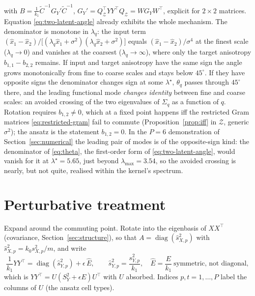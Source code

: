 \documentclass[11pt,a4paper]{article}
\newcommand{\diag}{\operatorname{diag}}
\newcommand{\Ct}{\tilde C}
\newcommand{\Z}{\mathcal Z}
\begin{document}
with $B = \frac1{k_1}\Ct^{-1}G_Y'\Ct^{-1}$, $G_Y' = Q_\Z^\top YY^\top Q_\Z = W G_Y W^\top$, explicit for $2\times2$ matrices. Equation \eqref{eq:two-latent-angle} already exhibits the whole mechanism. The denominator is monotone in $\lambda_q$: the input term $(\hat x_1 - \hat x_2)/\big[(\lambda_q\hat x_1+\sigma^2)(\lambda_q\hat x_2+\sigma^2)\big]$ equals $(\hat x_1-\hat x_2)/\sigma^4$ at the finest scale ($\lambda_q\to0$) and vanishes at the coarsest ($\lambda_q\to\infty$), where only the target anisotropy $b_{1,1}-b_{2,2}$ remains. If input and target anisotropy have the same sign the angle grows monotonically from fine to coarse scales and stays below $45^\circ$. If they have opposite signs the denominator changes sign at some $\lambda^\star$, $\theta_q$ passes through $45^\circ$ there, and the leading functional mode \emph{changes identity} between fine and coarse scales: an avoided crossing of the two eigenvalues of $\Sigma_q$ as a function of $q$. Rotation requires $b_{1,2} \ne 0$, which at a fixed point happens iff the restricted Gram matrices \eqref{eq:restricted-gram} fail to commute (Proposition~\ref{prop:iff} in $\Z$, generic $\sigma^2$); the ansatz is the statement $b_{1,2}=0$. In the $P = 6$ demonstration of Section~\ref{sec:numerical} the leading pair of modes is of the opposite-sign kind: the denominator of \eqref{eq:theta}, the first-order form of \eqref{eq:two-latent-angle}, would vanish for it at $\lambda^\star = 5.65$, just beyond $\lambda_{\max} = 3.54$, so the avoided crossing is nearly, but not quite, realised within the kernel's spectrum.

\section{Perturbative treatment}
\label{sec:perturbative}
Expand around the commuting point. Rotate into the eigenbasis of $XX^\top$ (covariance, Section~\ref{sec:structure}), so that $A = \diag(\hat s_{X,p}^2)$ with $\hat s_{X,p}^2 = k_0 s_{X,p}^2/m$, and write
\begin{equation}
  \frac{1}{k_1} YY^\top = \diag(\hat s_{Y,p}^2) + \epsilon\,\hat E, \qquad \hat s_{Y,p}^2 = \frac{s_{Y,p}^2}{k_1},\quad \hat E = \frac{E}{k_1}\ \text{symmetric, not diagonal},
\end{equation}
which is $YY^\top = U(S_Y^2 + \epsilon E)U^\top$ with $U$ absorbed. Indices $p, t = 1,\dots,P$ label the columns of $U$ (the ansatz cell types).
\end{document}
